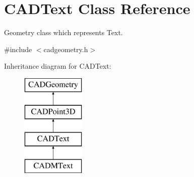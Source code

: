 \hypertarget{class_c_a_d_text}{}\section{C\+A\+D\+Text Class Reference}
\label{class_c_a_d_text}


Geometry class which represents Text.  




{\ttfamily \#include $<$cadgeometry.\+h$>$}

Inheritance diagram for C\+A\+D\+Text\+:\begin{figure}[H]
\begin{center}
\leavevmode
\includegraphics[height=5.000000cm]{class_c_a_d_text}
\end{center}
\end{figure}
